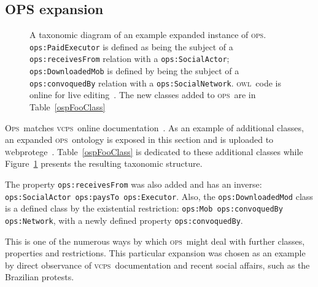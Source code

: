 \documentclass[10pt,letterpaper]{article}
\newcommand{\ops}{\textsc{ops}}
\newcommand{\opsi}{O\textsc{ps}}
\newcommand{\vcps}{\textsc{vcps}}
\newcommand{\owl}{\textsc{owl}}
\newcommand{\webprotege}{\textsc{w}ebprotege}
\begin{document}
\subsection{OPS expansion}\label{downwards}

    \begin{figure}
        \caption{A taxonomic diagram of an example expanded instance of \ops. {\tt ops:PaidExecutor} is defined as being the subject of a \texttt{ops:receivesFrom} relation with a \texttt{ops:SocialActor}; \texttt{ops:DownloadedMob} is defined by being the subject of a \texttt{ops:convoquedBy} relation with a \texttt{ops:SocialNetwork}. \owl\ code is online for live editing~\cite{owlExp}. The new classes added to \ops\ are in Table~\ref{ospFooClass}}
    \label{fig:owlExp}
    \end{figure}

\opsi\ matches \vcps\ online documentation~\cite{corais}. As an example of additional classes, an expanded \ops\ ontology is exposed in this section and is uploaded to \webprotege~\cite{owlExp}. Table~\ref{ospFooClass} is dedicated to these additional classes while Figure~\ref{fig:owlExp} presents the resulting taxonomic structure.

The property {\tt ops:receivesFrom} was also added and has an inverse: \texttt{ops:SocialActor ops:paysTo ops:Executor}. Also, the {\tt ops:DownloadedMod} class is a defined class by the existential restriction: \texttt{ops:Mob ops:convoquedBy ops:Network}, with a newly defined property \texttt{ops:convoquedBy}.

This is one of the numerous ways by which \ops\ might deal with further classes, properties and restrictions. This particular expansion was chosen as an example by direct observance of \vcps\ documentation and recent social affairs, such as the Brazilian protests.
\end{document}
